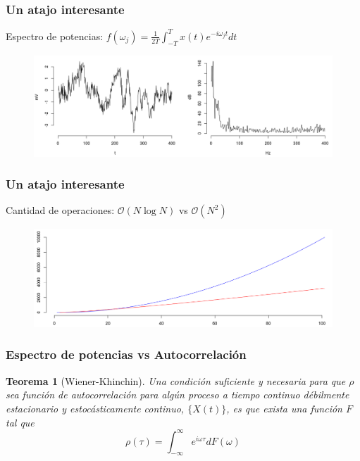 \documentclass[11pt]{beamer}
\newtheorem{thrm}{Teorema}
\newcommand{\R}{\mathbb{R}}
\newcommand{\intR}{\int_{-\infty}^{\infty}}
\newcommand{\simint}[1]{\int_{- #1 }^{ #1 }}
\begin{document}

\begin{frame}\frametitle{Un atajo interesante}
Espectro de potencias: 
$f(\omega_j) = \frac{1}{2 T} \simint{T} x(t) e^{-i \omega_j t} dt$
\begin{figure}
\centering
\includegraphics[width=\linewidth]{./curso_scripts/spec.png}
\end{figure}
\end{frame}


\begin{frame}\frametitle{Un atajo interesante}
Cantidad de operaciones: $\mathcal{O}(N \log{}N)$ vs $\mathcal{O}(N^{2})$
\begin{figure}
\centering
\includegraphics[width=\linewidth]{./curso_scripts/N.png}
\end{figure}
\end{frame}


\begin{frame}\frametitle{Espectro de potencias vs Autocorrelaci\'on}
\begin{thrm}[Wiener-Khinchin]
Una condici\'on suficiente y necesaria para que $\rho$ sea funci\'on de autocorrelaci\'on para 
alg\'un proceso a tiempo continuo d\'ebilmente estacionario y estoc\'asticamente continuo, 
$\{X(t)\}$,  es que exista una funci\'on $F$ tal que
\begin{equation*}
\rho(\tau) = \intR e^{i \omega \tau} dF(\omega)
\end{equation*}
\end{thrm}
\end{frame}
\end{document}
